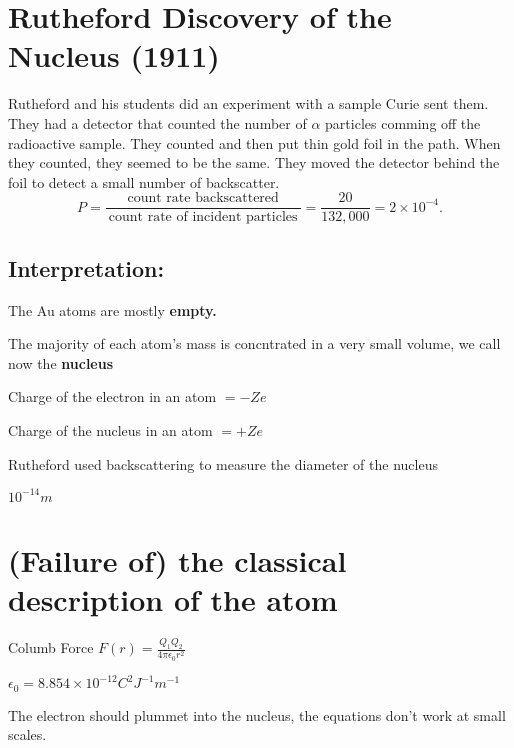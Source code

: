 \section{Rutheford Discovery of the Nucleus (1911)}%
\label{sec:rutheford_discovery_of_the_nucleus_1911_}

Rutheford and his students did an experiment with a sample Curie sent them. They had a detector
that counted the number of $\alpha$ particles comming off the radioactive sample. They counted
and then put thin gold foil in the path. When they counted, they seemed to be the same.
They moved the detector behind the foil to detect a small number of backscatter.\[
P = \frac{\:\text{count rate backscattered}\:}{\:\text{count rate of incident particles}\:} =
\frac{20}{132,000} = 2 \times 10^{-4}
.\]
\subsection{Interpretation:}%
\label{sub:interpretation_}

The Au atoms are mostly \textbf{empty.}

The majority of each atom's mass is concntrated in a very small volume, we call now the \textbf{nucleus}

\begin{definition}[]
	Charge of the electron in an atom $= -Ze$
\end{definition}
\begin{definition}[]
	Charge of the nucleus in an atom $= + Ze$
\end{definition}

Rutheford used backscattering to measure the diameter of the nucleus
\begin{definition}
	$10^{-14} m$
\end{definition}

\section{(Failure of) the classical description of the atom}%
\label{sec:failure_of_the_classical_description_of_the_atom}

\begin{definition}
	Columb Force $F(r) = \frac{Q_{1}Q_{2}}{4\pi \epsilon_{0}r^2}$
\end{definition}
\begin{definition}
	$\epsilon_{0}= 8.854 \times 10^{-12}C^2J^{-1}m^{-1}$
\end{definition}

The electron should plummet into the nucleus, the equations don't work at small scales.



\newpage


